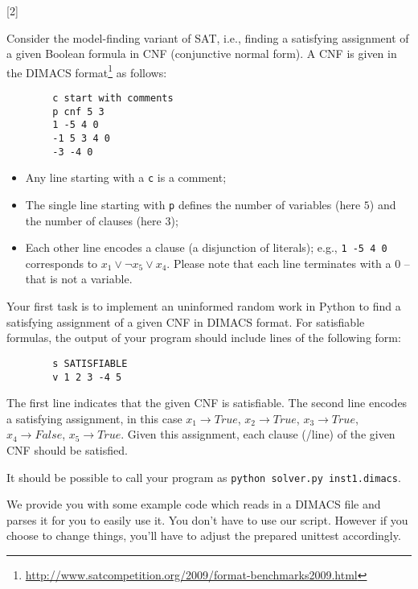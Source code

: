 \documentclass{exam}
\begin{document}
	
	\begin{questions}
		
		
		[2]
		
		Consider the model-finding variant of SAT, i.e., finding a satisfying assignment of a given Boolean formula in CNF (conjunctive normal form).
		A CNF is given in the DIMACS format\footnote{\url{http://www.satcompetition.org/2009/format-benchmarks2009.html}} as follows:
		
		\begin{verbatim}
		c start with comments
		p cnf 5 3
		1 -5 4 0
		-1 5 3 4 0
		-3 -4 0
		\end{verbatim}
		
		\begin{itemize}
			\item Any line starting with a \texttt{c} is a comment;
			\item The single line starting with \texttt{p} defines the number of variables (here $5$) and the number of clauses (here $3$);
			\item Each other line encodes a clause (a disjunction of literals); e.g., \texttt{1 -5 4 0} corresponds to $x_1 \vee \neg x_5 \vee x_4$. Please note that each line terminates with a $0$ -- that is not a variable.
		\end{itemize}	
		
		Your first task is to implement an uninformed random work in Python to find a satisfying assignment of a given CNF in DIMACS format.
		For satisfiable formulas, the output of your program should include lines of the following form:
		
		\begin{verbatim}
		s SATISFIABLE
		v 1 2 3 -4 5
		\end{verbatim}
		
		The first line indicates that the given CNF is satisfiable.
		The second line encodes a satisfying assignment, in this case $x_1 \to True$, $x_2 \to True$, $x_3 \to True$, $x_4 \to False$, $x_5 \to True$. Given this assignment, each clause (/line) of the given CNF should be satisfied.
		
		It should be possible to call your program as \texttt{python solver.py inst1.dimacs}.
		
		We provide you with some example code which reads in a DIMACS file and parses it for you to easily use it. You don't have to use our script. However if you choose to change things, you'll have to adjust the prepared unittest accordingly.
		

\end{questions}
\end{document}
